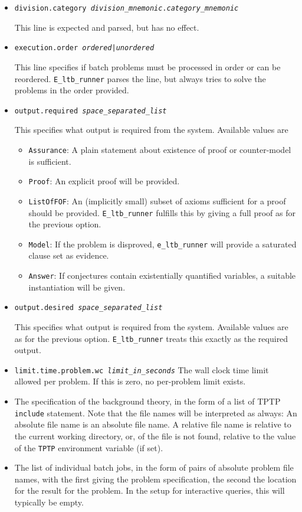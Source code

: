 \documentclass{report}
\begin{document}
\begin{itemize}
\item \texttt{division.category \emph{division\_mnemonic}.\emph{category\_mnemonic}}

  This line is expected and parsed, but has no effect.
\item \texttt{execution.order \emph{ordered}|\emph{unordered}}

  This line specifies if batch problems must be processed in order or
  can be reordered.  \texttt{E\_ltb\_runner} parses the line, but
  always tries to solve the problems in the order provided.
\item \texttt{output.required \emph{space\_separated\_list}}

  This specifies what output is required from the system. Available
  values are
  \begin{itemize}
  \item \texttt{Assurance}: A plain statement about existence of proof
    or counter-model is sufficient.
  \item \texttt{Proof}: An explicit proof will be provided.
  \item \texttt{ListOfFOF}: An (implicitly small) subset of axioms
    sufficient for a proof should be provided. \texttt{E\_ltb\_runner}
    fulfills this by giving a full proof as for the previous option.
  \item \texttt{Model}: If the problem is disproved,
    \texttt{e\_ltb\_runner} will provide a saturated clause set as evidence.
  \item \texttt{Answer}: If conjectures contain existentially
    quantified variables, a suitable instantiation will be given.
  \end{itemize}
\item \texttt{output.desired \emph{space\_separated\_list}}

   This specifies what output is required from the system. Available
  values are as for the previous option.  \texttt{E\_ltb\_runner}
  treats this exactly as the required output.
\item \texttt{limit.time.problem.wc \emph{limit\_in\_seconds}}
  The wall clock time limit allowed per problem. If this is zero, no
  per-problem limit exists.
\item The specification of the background theory, in the form of a
  list of TPTP \texttt{include} statement. Note that the file names
  will be interpreted as always: An absolute file name is an absolute
  file name. A relative file name is relative to the current working
  directory, or, of the file is not found, relative to the value of
  the \texttt{TPTP} environment variable (if set).
\item The list of individual batch jobs, in the form of pairs of
  absolute problem file names, with the first giving the problem
  specification, the second the location for the result for the
  problem. In the setup for interactive queries, this will typically
  be empty.
\end{itemize}
\end{document}

